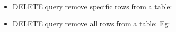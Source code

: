 
\begin{flushleft}
	
	\begin{itemize}
		\item DELETE query remove specific rows from a table:
		
		\item DELETE query remove all rows from a table:
		Eg:
	\end{itemize}	
	
\end{flushleft}

\newpage
